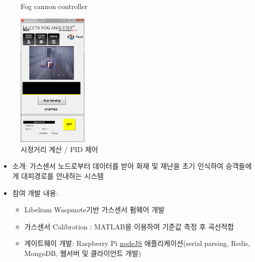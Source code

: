 \documentclass[10pt,a4paper,ragged2e]{altacv}
\begin{document}
\begin{fullwidth}
\begin{itemize}
\begin{figure}[!ht]
\begin{fullwidth}
{      \caption*{Fog cannon controller}
    }\qquad
    \parbox{0.3\textwidth}{
      \includegraphics[width=0.3\textwidth]{images/fog_03.png}
      \caption*{시정거리 계산 / PID 제어}
    }
    \end{fullwidth}
  \end{figure}
\end{itemize}

\divider


\begin{itemize}
\item
  소개: 가스센서 노드로부터 데이터를 받아 화재 및 재난을 초기 인식하여 승객들에게 대피경로를 안내하는 시스템
\item
  참여 개발 내용:
  \begin{itemize}
    \item Libelium Waspmote기반 가스센서 펌웨어 개발
    \item 가스센서 Calibration : MATLAB을 이용하여 기준값 측정 후 곡선적합
    \item 게이트웨이 개발: Raspberry Pi \href{https://nodejs.org}{nodeJS} 애플리케이션(serial parsing, Redis, MongoDB, 웹서버 및 클라이언트 개발)
  

\end{itemize}
\end{itemize}
\end{fullwidth}
\end{document}
